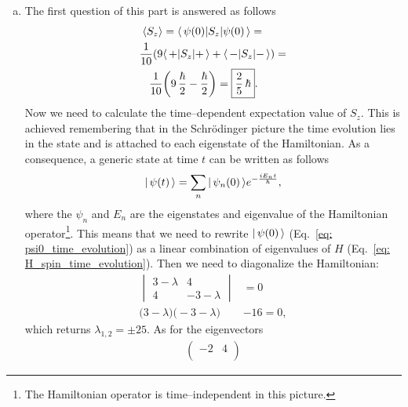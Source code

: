 \begin{enumerate}[(a)]
    \item The first question of this part is answered as follows
    \begin{equation}
        \begin{split}
            \langle S_z \rangle & = \langle \,  \psi (0) | S_z | \psi (0) \, \rangle = \\
            \frac{1}{10}  ( 9 & \langle \,  + | S_z | + \, \rangle + \langle \,  - | S_z | - \, \rangle ) = \\
            \frac{1}{10} & \biggl( 9 \, \frac{\hbar}{2} - \frac{\hbar}{2} \biggr) = \boxed{\frac{2}{5} \, \hbar}.
        \end{split}
    \end{equation}
    Now we need to calculate the time--dependent expectation value of $S_z$. This is achieved remembering that in the Schr\"odinger picture the time evolution lies in the state and is attached to each eigenstate of the Hamiltonian. As a consequence, a generic state at time $t$ can be written as follows
    \begin{equation}
        | \, \psi (t) \, \rangle = \sum_n | \, \psi_n (0) \, \rangle e^{-\frac{i E_n t}{\hbar}},
    \end{equation}
    where the $\psi_n$ and $E_n$ are the eigenstates and eigenvalue of the Hamiltonian operator\footnote{The Hamiltonian operator is time--independent in this picture.}. This means that we need to rewrite $| \, \psi (0) \, \rangle$ (Eq.~\eqref{eq: psi0_time_evolution}) as a linear combination of eigenvalues of $H$ (Eq.~\eqref{eq: H_spin_time_evolution}). Then we need to diagonalize the Hamiltonian:
    \begin{equation}
        \begin{split}
            \begin{vmatrix}
                3 - \lambda & 4 \\
                4 & - 3 - \lambda 
            \end{vmatrix}
            & = 0 \\
            \bigl( 3 - \lambda \bigr)  \bigl( - 3 - \lambda \bigr) & - 16 = 0,
        \end{split}
    \end{equation}
    which returns $ \lambda_{1,2} = \pm 25$. As for the eigenvectors
    \begin{equation}
        \begin{split}
            \begin{pmatrix}
                -2 & 4 \\

\end{pmatrix}
\end{split}
\end{equation}
\end{enumerate}
